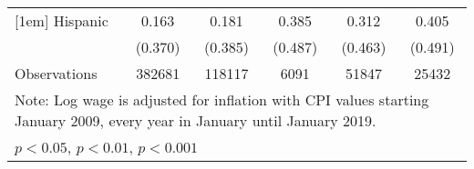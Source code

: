 \begin{table}[htbp]
\begin{tabular}{l*{5}{c}}
[1em]
Hispanic            &       0.163         &       0.181         &       0.385         &       0.312         &       0.405         \\
                    &     (0.370)         &     (0.385)         &     (0.487)         &     (0.463)         &     (0.491)         \\
\hline
Observations        &      382681         &      118117         &        6091         &       51847         &       25432         \\
\hline\hline
\multicolumn{6}{l}{\footnotesize Note: Log wage is adjusted for inflation with CPI values starting January 2009, every year in January until January 2019.}\\
\multicolumn{6}{l}{\footnotesize \sym{*} \(p<0.05\), \sym{**} \(p<0.01\), \sym{***} \(p<0.001\)}\\
\end{tabular}
\end{table}
